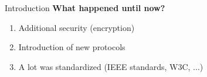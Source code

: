 \begin{frame}{Introduction}
    \textbf{What happened until now?}

    \begin{enumerate}
        \item<1-> Additional security (encryption)
        \item<2-> Introduction of new protocols
        \item<3> A lot was standardized (IEEE standards, W3C, ...)
    \end{enumerate}
\end{frame}
